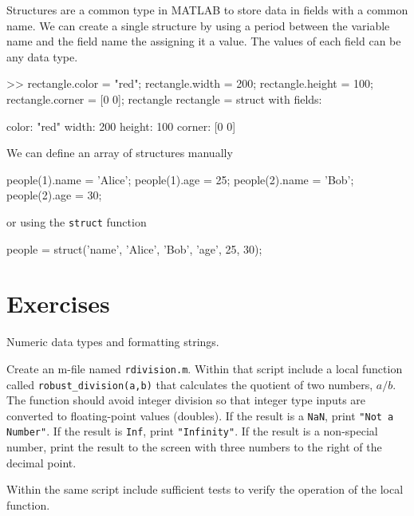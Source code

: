 Structures are a common type in MATLAB to store data in fields with a common name. We can create a single structure by using a period between the variable name and the field name the assigning it a value.  The values of each field can be any data type.
\begin{code}
>> rectangle.color = "red";
rectangle.width = 200;
rectangle.height = 100;
rectangle.corner = [0 0];
rectangle
rectangle = 
  struct with fields:

     color: "red"
     width: 200
    height: 100
    corner: [0 0]
\end{code}

We can define an array of structures manually
\begin{code}
    people(1).name = 'Alice';
    people(1).age = 25;
    people(2).name = 'Bob';
    people(2).age = 30;
\end{code}

or using the \lstinline{struct} function
\begin{code}
people = struct('name', {'Alice', 'Bob'}, 'age', {25, 30});
\end{code}


\section{Exercises}

\begin{ex}
    Numeric data types and formatting strings.

    Create an m-file named \lstinline{rdivision.m}.  Within that script include a local function called \lstinline{robust_division(a,b)} that calculates the quotient of two numbers, $a/b$. The function should avoid integer division so that integer type inputs are converted to floating-point values (doubles).  If the result is a \lstinline{NaN}, print \lstinline{"Not a Number"}.  If the result is \lstinline{Inf}, print \lstinline{"Infinity"}. If the result is a non-special number, print the result to the screen with three numbers to the right of the decimal point.
    
    Within the same script include sufficient tests to verify the operation of the local function.  
\end{ex}



